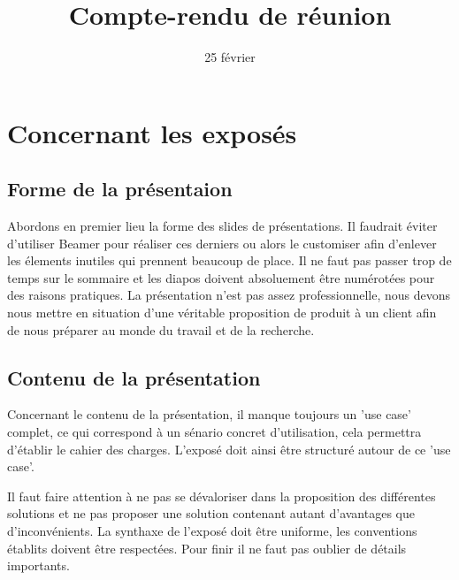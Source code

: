\documentclass{article}
\title{Compte-rendu de réunion}
\date{25 février}
\begin{document}
\maketitle


\section{Concernant les exposés}
\subsection{Forme de la présentaion}
\bigbreak
Abordons en premier lieu la forme des slides de présentations. Il faudrait éviter d'utiliser Beamer pour réaliser ces derniers ou alors le customiser afin d'enlever les élements inutiles qui prennent beaucoup de place. Il ne faut pas passer trop de temps sur le sommaire et les diapos doivent absoluement être numérotées pour des raisons pratiques.
\bigbreak
La présentation n'est pas assez professionnelle, nous devons nous mettre en situation d'une véritable proposition de produit à un client afin de nous préparer au monde du travail et de la recherche.
\bigbreak

\subsection{Contenu de la présentation}
\bigbreak
Concernant le contenu de la présentation, il manque toujours un 'use case' complet, ce qui correspond à un sénario concret d'utilisation, cela permettra d'établir le cahier des charges. L'exposé doit ainsi être structuré autour de ce 'use case'.

\bigbreak
Il faut faire attention à ne pas se dévaloriser dans la proposition des différentes solutions et ne pas proposer une solution contenant autant d'avantages que d'inconvénients.
\bigbreak
La synthaxe de l'exposé doit être uniforme, les conventions établits doivent être respectées. Pour finir il ne faut pas oublier de détails importants.

\bigbreak
\end{document}
